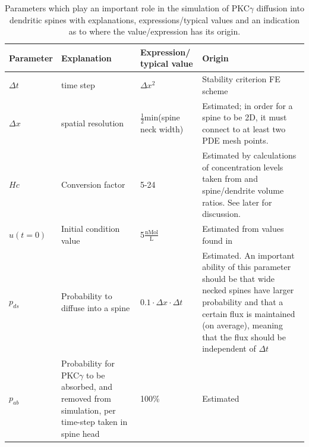  \begin{table}[H]
\centering
\begin{tabular}{|p{}|p{}|p{}|p{}|}
\hline
\textbf{Parameter} & \textbf{Explanation} &\textbf{Expression/ typical value}& \textbf{Origin} \\
\hline
$\Delta t$ & time step & $\Delta x^2$ & Stability criterion FE scheme \\
\hline
$\Delta x$ & spatial resolution & $\frac{1}{2}$min(spine neck width) & Estimated; in order for a spine to be 2D, it must connect to at least two PDE mesh points. \\
\hline
$Hc$ & Conversion factor & 5-24 & Estimated by calculations of concentration levels taken from \cite{light1996protein} and spine/dendrite volume ratios. See later for discussion. \\
\hline
$u(t=0)$ & Initial condition value & 5$\frac{\text{nMol}}{\text{L}}$ & Estimated from values found in \cite{light1996protein}\\
\hline
$p_{ds}$ & Probability to diffuse into a spine & $0.1\cdot\Delta x\cdot\Delta t$& Estimated. An important ability of this parameter should be that wide necked spines have larger probability and that a certain flux is maintained (on average), meaning that the flux should be independent of $\Delta t$ \\
\hline
$p_{ab}$ & Probability for PKC$\gamma$ to be absorbed, and removed from simulation, per time-step taken in spine head & 100\% & Estimated\\
\hline
\end{tabular}
\caption[Important parameters]{Parameters which play an important role in the simulation of PKC$\gamma$ diffusion into dendritic spines with explanations, expressions/typical values and an indication as to where the value/expression has its origin.}
\label{table:parameters}
\end{table}
